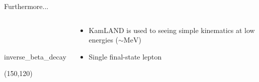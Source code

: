 \documentclass[14pt]{beamer}
\begin{document}
\begin{frame}[fragile]{Furthermore...}
	\centering
	\begin{columns}[T]
		\begin{block}{\\~\\}
			\centering
			\begin{fmffile}{inverse_beta_decay} \begin{fmfgraph*}(150,120)
				 
			\end{fmfgraph*} \end{fmffile}
		\end{block}
		\begin{block}{}
			\begin{itemize}
				\item<2-> KamLAND is used to seeing simple kinematics at low
					energies ($\sim\si{\mega\electronvolt}$)
				\item<3-> Single final-state lepton
			\end{itemize}
		\end{block}
	\end{columns}
\end{frame}
\end{document}
